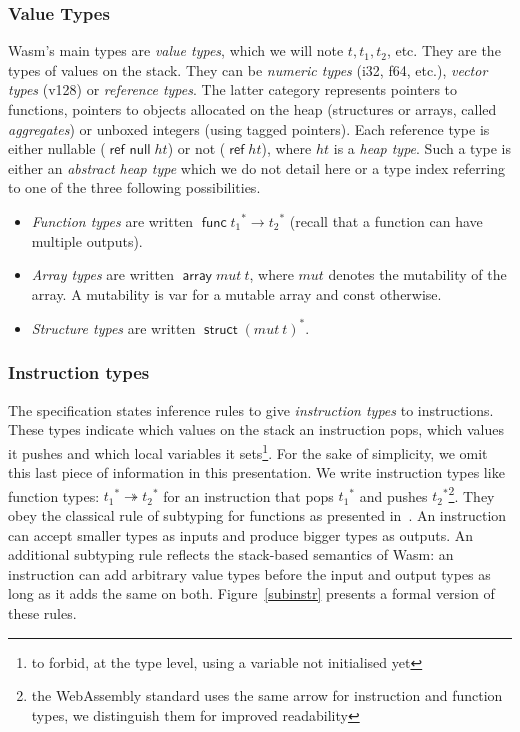 \documentclass[a4paper,11pt]{article}
\DeclareMathOperator{\reft}{\textsf{ref}}
\DeclareMathOperator{\strt}{\textsf{struct}}
\DeclareMathOperator{\arrt}{\textsf{array}}
\DeclareMathOperator{\funt}{\textsf{func}}
\DeclareMathOperator{\refnullt}{\textsf{ref null}}
\begin{document}
\subsubsection{Value Types}
Wasm's main types are \emph{value types}, which we will note $t, t_1, t_2$, etc.
They are the types of values on the stack. They can be \emph{numeric types}
(\textsf{i32}, \textsf{f64}, etc.), \emph{vector types} (\textsf{v128}) or
\emph{reference types}. The latter category represents pointers to functions,
pointers to objects allocated on the heap (structures or arrays, called
\emph{aggregates}) or unboxed integers (using tagged pointers). Each reference
type is either nullable ($\refnullt ht$) or not ($\reft ht$), where $ht$ is a
\emph{heap type}. Such a type is either an \emph{abstract heap type} which we do
not detail here or a type index referring to one of the three following
possibilities.
\begin{itemize}\setlength{\itemsep}{0pt}
  \item \emph{Function types} are written
$\funt{t_1}^*\to{t_2}^*$ (recall that a function can have multiple outputs).
  \item \emph{Array types} are written $\arrt mut\ t$, where $mut$ denotes the
    mutability of the array. A mutability is \textsf{var} for a mutable array
    and \textsf{const} otherwise.
\item \emph{Structure types} are written $\strt {(mut\ t)}^*$.
\end{itemize}

\subsubsection{Instruction types}
The specification states inference rules to give \emph{instruction types} to
instructions. These types indicate which values on the stack an instruction
pops, which values it pushes and which local variables it sets\footnote{to
forbid, at the type level, using a variable not initialised yet}. For the sake
of simplicity, we omit this last piece of information in this presentation. We
write instruction types like function types: ${t_1}^*\twoheadrightarrow{t_2}^*$
for an instruction that pops ${t_1}^*$ and pushes ${t_2}^*$\footnote{the
WebAssembly standard uses the same arrow for instruction and function types, we
distinguish them for improved readability}. They obey the classical rule of
subtyping for functions as presented in~\cite{cardelli1988semantics}. An
instruction can accept smaller types as inputs and produce bigger types as
outputs.
An additional subtyping rule reflects the stack-based semantics of Wasm: an
instruction can add arbitrary value types before the input and output types as
long as it adds the same on both. Figure~\ref{subinstr} presents a formal
version of these rules.
\end{document}
